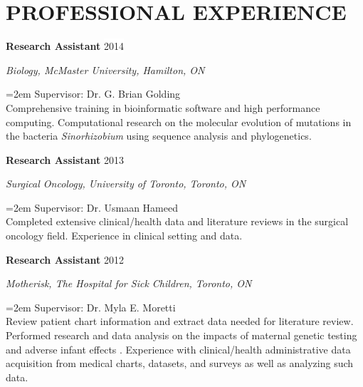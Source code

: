 \documentclass[paper=a4,fontsize=11pt]{scrartcl}	 			%
\renewcommand{\refname}{PUBLICATIONS}
\newcommand{\NewPart}[1]{\section*{\uppercase{#1}}}
\newcommand{\EducationEntry}[4]{
		\noindent \textbf{#1} \hfill 					%
		\colorbox{White}{%
			\parbox{10em}{%
			\hfill\color{Black}#2}} \par				%
		\noindent \textit{#3} \par					%
		\noindent\hangindent=2em\hangafter=0 \small #4 	%
		\normalsize \par}
\newcommand{\WorkEntry}[4]{						%
		\noindent \textbf{#1} \hfill 					%
		\colorbox{White}{\color{Black}#2} \par		%
		\noindent \textit{#3} \par					%
		\noindent\hangindent=2em\hangafter=0 \small #4 	%
		\normalsize \par}
\begin{document}
\NewPart{Professional Experience}{}

\WorkEntry{Research Assistant}{2014}{Biology, McMaster University, Hamilton, ON}{Supervisor: Dr. G. Brian Golding \\ Comprehensive training in bioinformatic software and high performance computing. Computational research on the molecular evolution of mutations in the bacteria \textit{Sinorhizobium} using sequence analysis and phylogenetics.}
\WorkEntry{Research Assistant}{2013}{Surgical Oncology, University of Toronto, Toronto, ON}{Supervisor: Dr. Usmaan Hameed \\ Completed extensive clinical/health data and literature reviews in the surgical oncology field. Experience in clinical setting and data.}
\sloppy\WorkEntry{Research Assistant}{2012}{Motherisk, The Hospital for Sick Children, Toronto, ON}{Supervisor: Dr. Myla E. Moretti \\ Review patient chart information and extract data needed for literature review. Performed research and data analysis on the impacts of maternal genetic testing and adverse infant effects \cite{More:17}. Experience with clinical/health administrative data acquisition from medical charts, datasets, and surveys as well as analyzing such data.}



%
\nocite{*}


%

%

\end{document}

